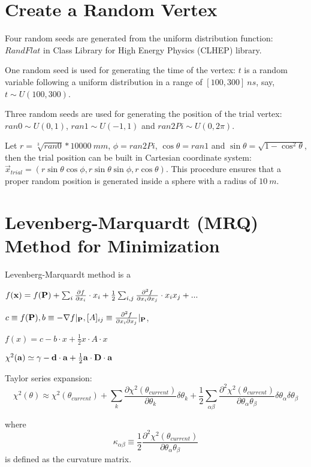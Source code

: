 \section{Create a Random Vertex}

Four random seeds are generated from the uniform distribution function: $RandFlat$ in Class Library for High Energy Physics (CLHEP) library.

One random seed is used for generating the time of the vertex: $t$ is a random variable following a uniform distribution in a range of $[100, 300]~ns$, say, $t\sim U(100,300)$.

Three random seeds are used for generating the position of the trial vertex: $ran0\sim U(0,1)$, $ran1\sim U(-1,1)$ and $ran2Pi\sim U(0,2\pi)$. 

Let $r=\sqrt[3]{ran0}*10000~mm$, $\phi=ran2Pi$, $\cos\theta=ran1$ and $\sin\theta=\sqrt{1-{\cos^2\theta}}$, then the trial position can be built in Cartesian coordinate system: $\vec{x}_{trial}=(r\sin\theta\cos\phi, r\sin\theta\sin\phi, r\cos\theta)$. This procedure ensures that a proper random position is generated inside a sphere with a radius of $10~m$.

\section{Levenberg-Marquardt (MRQ) Method for Minimization}


Levenberg-Marquardt method is a 

$f({\bf{x}})=f({\bf{P}})+\sum_i\frac{\partial f}{\partial x_i}\cdot x_i+\frac{1}{2}\sum_{i,j}\frac{\partial^2f}{\partial x_i\partial x_j}\cdot x_ix_j+...$

 $c\equiv f({\bf{P}}), b\equiv -\nabla f|_{\bf{P}}, [A]_{ij}\equiv \frac{\partial^2f}{\partial x_i\partial x_j}|_{\bf{P}}$, 


$f(x)=c-b\cdot x+\frac{1}{2}x\cdot A\cdot x$


$\chi^2({\bf a})\simeq \gamma-{\bf d\cdot a}+\frac{1}{2}{\bf a\cdot D\cdot a}$



Taylor series expansion:
\[
\chi^2(\theta)\approx\chi^2(\theta_{current})+\sum_k\frac{\partial \chi^2(\theta_{current})}{\partial \theta_k}\delta\theta_k+\frac{1}{2}\sum_{\alpha\beta}\frac{\partial^2\chi^2(\theta_{current})}{\partial\theta_\alpha\theta_\beta}\delta\theta_\alpha\delta\theta_\beta
\]

where \[
\kappa_{\alpha\beta}\equiv \frac{1}{2} \frac{\partial^2\chi^2(\theta_{current})}{\partial\theta_\alpha\theta_\beta}
\]
is defined as the curvature matrix\cite{gregory2005bayesian}.
